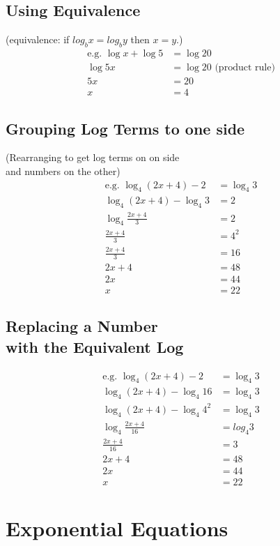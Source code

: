 \documentclass{article}
\begin{document}
\subsection*{Using Equivalence}
(equivalence: if $log_b{x}=log_b{y}$ then $x=y$.)
\begin{align*}
\text{e.g. }\log{x}+\log{5}&=\log{20}\\
\log{5x}&=\log{20}\text{ (product rule)}\\
5x&=20\\
x&=4
\end{align*}

\newpage

\subsection*{Grouping Log Terms to one side}

(Rearranging to get log terms on on side\\ and numbers on the other)
\begin{align*}
\text{e.g. }\log_4{(2x+4)}-2&=\log_4{3}\\
\log_4{(2x+4)}-\log_4{3}&=2\\
\log_4{\frac{2x+4}{3}}&=2\\
\frac{2x+4}{3}&=4^2\\
\frac{2x+4}{3}&=16\\
2x+4&=48\\
2x&=44\\
x&=22
\end{align*}

\subsection*{Replacing a Number\\ with the Equivalent Log}
\begin{align*}
\text{e.g. }\log_4{(2x+4)}-2&=\log_4{3}\\
\log_4{(2x+4)}-\log_4{16}&=\log_4{3}\\
\log_4{(2x+4)}-\log_4{4^2}&=\log_4{3}\\
\log_4\frac{2x+4}{16}&=log_4{3}\\
\frac{2x+4}{16}&=3\\
2x+4&=48\\
2x&=44\\
x&=22
\end{align*}

\newpage

\section{Exponential Equations}
\end{document}
